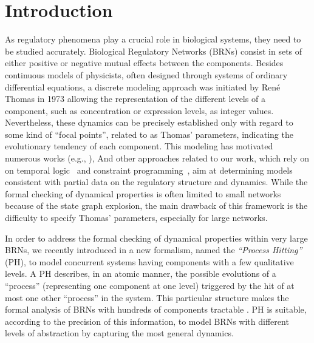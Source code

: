 \section{Introduction}
As regulatory phenomena play a crucial role in biological systems, they need to be studied accurately.
Biological Regulatory Networks (BRNs) consist in sets of either positive or negative mutual effects between the components.
Besides continuous models of physicists, often designed through systems of ordinary
differential equations, a discrete modeling approach was initiated by René Thomas in 1973
\cite{Thomas73} allowing the representation of the different levels of a component, such as concentration or expression levels, as integer values.
Nevertheless, these dynamics can be precisely established only with regard to some kind of ``focal points'', related to as Thomas' parameters, indicating the evolutionary tendency of each component.
This modeling has motivated numerous works (e.g.,
\cite{RiCo07,Naldi09,Siebert06,Ahmad08}), %
And other approaches related to our work, which rely on on temporal logic~\cite{Khalis09} and constraint programming~\cite{20646302,DBLP:conf/ipcat/CorblinFTCT12},
aim at determining models consistent with partial data on the regulatory structure and dynamics.
While the formal checking of dynamical properties is often limited to small networks because of the
state graph explosion, the main drawback of this framework is the difficulty to specify Thomas'
parameters, especially for large networks.

In order to address the formal checking of dynamical properties within very large BRNs, we recently
introduced in \cite{PMR10-TCSB} a new formalism, named the \emph{``Process Hitting''} (PH), to model
concurrent systems having components with a few qualitative levels.
A PH describes, in an atomic manner, the possible evolutions of a “process” (representing one
component at one level) triggered by the hit of at most one other “process” in the system.
This particular structure makes the formal analysis of BRNs with hundreds of components tractable \cite{PMR12-MSCS}.
PH is suitable, according to the precision of this information, to model BRNs with different levels of abstraction by capturing the most general dynamics.

